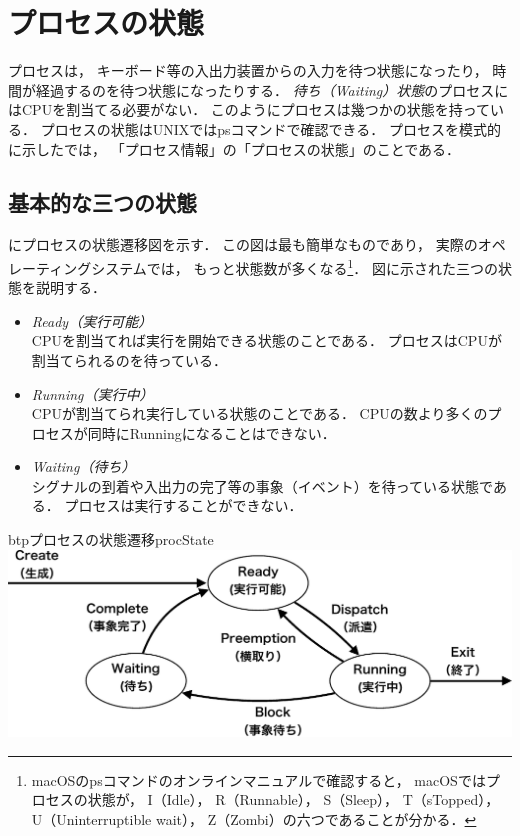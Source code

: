 \section{プロセスの状態}
\label{procState}
プロセスは，
キーボード等の入出力装置からの入力を待つ状態になったり，
時間が経過するのを待つ状態になったりする．
\emph{待ち（Waiting）状態}のプロセスにはCPUを割当てる必要がない．
このようにプロセスは幾つかの状態を持っている．
プロセスの状態はUNIXではpsコマンドで確認できる．
プロセスを模式的に示したでは，
「プロセス情報」の「プロセスの状態」のことである．

\subsection{基本的な三つの状態}
にプロセスの状態遷移図を示す．
この図は最も簡単なものであり，
実際のオペレーティングシステムでは，
もっと状態数が多くなる\footnote{
  macOSのpsコマンドのオンラインマニュアルで確認すると，
  macOSではプロセスの状態が，
  I（Idle），
  R（Runnable），
  S（Sleep），
  T（sTopped），
  U（Uninterruptible wait），
  Z（Zombi）の六つであることが分かる．}．
図に示された三つの状態を説明する．

\begin{itemize}
\item \emph{Ready（実行可能）} \\
  CPUを割当てれば実行を開始できる状態のことである．
  プロセスはCPUが割当てられるのを待っている．
\item \emph{Running（実行中）} \\
  CPUが割当てられ実行している状態のことである．
  CPUの数より多くのプロセスが同時にRunningになることはできない．
\item \emph{Waiting（待ち）} \\
  シグナルの到着や入出力の完了等の事象（イベント）を待っている状態である．
  プロセスは実行することができない．
\end{itemize}

\begin{myfig}{btp}{プロセスの状態遷移}{procState}
  \includegraphics[scale=0.66]{Fig/procState-crop.pdf}
\end{myfig}

